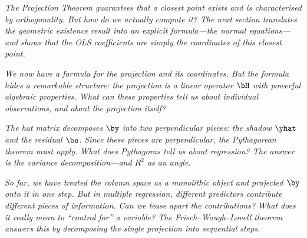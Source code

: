 
\medskip
\noindent\textit{The Projection Theorem guarantees that a closest point
exists and is characterised by orthogonality.
But how do we actually \emph{compute} it?
The next section translates the geometric existence result into an
explicit formula---the normal equations---and shows that the OLS
coefficients are simply the coordinates of this closest point.}



\medskip
\noindent\textit{We now have a formula for the projection and its
coordinates.
But the formula hides a remarkable structure: the projection is a
\emph{linear operator} $\bH$ with powerful algebraic properties.
What can these properties tell us about individual observations,
and about the projection itself?}



\medskip
\noindent\textit{The hat matrix decomposes $\by$ into two perpendicular
pieces: the shadow $\yhat$ and the residual $\be$.
Since these pieces are perpendicular, the Pythagorean theorem must
apply.
What does Pythagoras tell us about regression?
The answer is the variance decomposition---and $R^2$ as an angle.}



\medskip
\noindent\textit{So far, we have treated the column space as a monolithic
object and projected $\by$ onto it in one step.
But in multiple regression, different predictors contribute different
pieces of information.
Can we tease apart the contributions?
What does it really mean to ``control for'' a variable?
The Frisch--Waugh--Lovell theorem answers this by decomposing the
single projection into sequential steps.}


